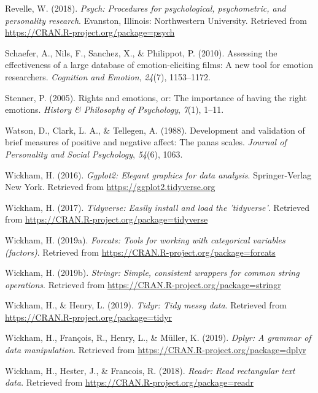 \documentclass[man]{apa6}
\begin{document}
\hypertarget{ref-R-psych}{}
Revelle, W. (2018). \emph{Psych: Procedures for psychological,
psychometric, and personality research}. Evanston, Illinois:
Northwestern University. Retrieved from
\url{https://CRAN.R-project.org/package=psych}

\hypertarget{ref-schaefer2010}{}
Schaefer, A., Nils, F., Sanchez, X., \& Philippot, P. (2010). Assessing
the effectiveness of a large database of emotion-eliciting films: A new
tool for emotion researchers. \emph{Cognition and Emotion},
\emph{24}(7), 1153--1172.

\hypertarget{ref-stenner2005rights}{}
Stenner, P. (2005). Rights and emotions, or: The importance of having
the right emotions. \emph{History \& Philosophy of Psychology},
\emph{7}(1), 1--11.

\hypertarget{ref-watson1988development}{}
Watson, D., Clark, L. A., \& Tellegen, A. (1988). Development and
validation of brief measures of positive and negative affect: The panas
scales. \emph{Journal of Personality and Social Psychology},
\emph{54}(6), 1063.

\hypertarget{ref-R-ggplot2}{}
Wickham, H. (2016). \emph{Ggplot2: Elegant graphics for data analysis}.
Springer-Verlag New York. Retrieved from
\url{https://ggplot2.tidyverse.org}

\hypertarget{ref-R-tidyverse}{}
Wickham, H. (2017). \emph{Tidyverse: Easily install and load the
'tidyverse'}. Retrieved from
\url{https://CRAN.R-project.org/package=tidyverse}

\hypertarget{ref-R-forcats}{}
Wickham, H. (2019a). \emph{Forcats: Tools for working with categorical
variables (factors)}. Retrieved from
\url{https://CRAN.R-project.org/package=forcats}

\hypertarget{ref-R-stringr}{}
Wickham, H. (2019b). \emph{Stringr: Simple, consistent wrappers for
common string operations}. Retrieved from
\url{https://CRAN.R-project.org/package=stringr}

\hypertarget{ref-R-tidyr}{}
Wickham, H., \& Henry, L. (2019). \emph{Tidyr: Tidy messy data}.
Retrieved from \url{https://CRAN.R-project.org/package=tidyr}

\hypertarget{ref-R-dplyr}{}
Wickham, H., François, R., Henry, L., \& Müller, K. (2019). \emph{Dplyr:
A grammar of data manipulation}. Retrieved from
\url{https://CRAN.R-project.org/package=dplyr}

\hypertarget{ref-R-readr}{}
Wickham, H., Hester, J., \& Francois, R. (2018). \emph{Readr: Read
rectangular text data}. Retrieved from
\url{https://CRAN.R-project.org/package=readr}
\end{document}

